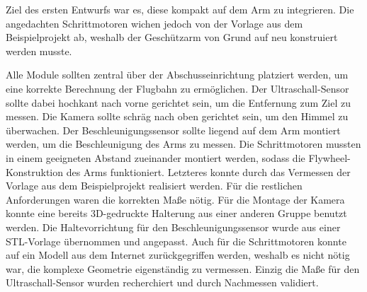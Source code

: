Ziel des ersten Entwurfs war es, diese kompakt auf dem Arm zu integrieren. Die angedachten Schrittmotoren wichen jedoch von der Vorlage aus dem Beispielprojekt \cite{cad_turret_blueprint} ab, weshalb der Geschützarm von Grund auf neu konstruiert werden musste.

Alle Module sollten zentral über der Abschusseinrichtung platziert werden, um eine korrekte Berechnung der Flugbahn zu ermöglichen. Der Ultraschall-Sensor sollte dabei hochkant nach vorne gerichtet sein, um die Entfernung zum Ziel zu messen. Die Kamera sollte schräg nach oben gerichtet sein, um den Himmel zu überwachen. Der Beschleunigungssensor sollte liegend auf dem Arm montiert werden, um die Beschleunigung des Arms zu messen. Die Schrittmotoren mussten in einem geeigneten Abstand zueinander montiert werden, sodass die Flywheel-Konstruktion des Arms funktioniert. Letzteres konnte durch das Vermessen der Vorlage aus dem Beispielprojekt \cite{cad_turret_blueprint} realisiert werden. Für die restlichen Anforderungen waren die korrekten Maße nötig. Für die Montage der Kamera konnte eine bereits 3D-gedruckte Halterung aus einer anderen Gruppe benutzt werden. Die Haltevorrichtung für den Beschleunigungssensor wurde aus einer STL-Vorlage \cite{cad_gyro_blueprint} übernommen und angepasst. Auch für die Schrittmotoren konnte auf ein Modell aus dem Internet \cite{cad_servo_v1_blueprint} zurückgegriffen werden, weshalb es nicht nötig war, die komplexe Geometrie eigenständig zu vermessen. Einzig die Maße für den Ultraschall-Sensor wurden recherchiert \cite{cad_geometry_srf02} und durch Nachmessen validiert.

